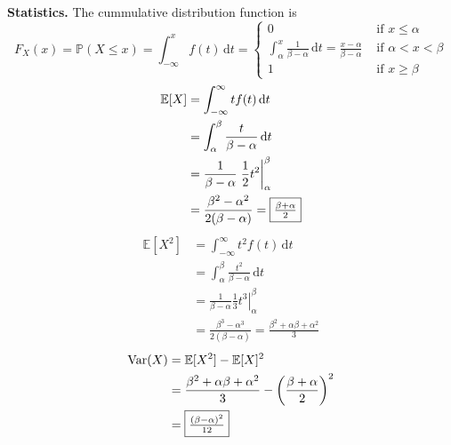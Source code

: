 \documentclass[a4paper,11pt]{amsbook}
\theoremstyle{definition}
\theoremstyle{remark}
\newcommand{\E}{\mathbb{E}}
\renewcommand{\P}{\mathbb{P}}
\DeclareMathOperator\Var{Var}
\newcommand\0{\varnothing}
\newcommand\dt[1][t]{\,\mathrm{d}#1}
\begin{document}
    \textbf{Statistics.} The cummulative distribution function is $$F_X(x)=\P(X\leq x)=\int_{-\infty}^xf(t)\dt=\begin{cases}
        0 & \text{ if }x\leq\alpha \\[5pt]
        \int_\alpha^x\frac1{\beta-\alpha}\dt=\frac{x-\alpha}{\beta-\alpha} & \text{ if }\alpha<x<\beta\\[5pt]
        1 & \text{ if }x\geq\beta
    \end{cases}$$
    \begin{align*}
        \E[X]&=\int_{-\infty}^\infty tf(t)\dt \\
        &=\int_\alpha^\beta\frac{t}{\beta-\alpha}\dt \\
        &=\frac{1}{\beta-\alpha}\left.\frac12t^2\right|_\alpha^\beta \\
        &=\frac{\beta^2-\alpha^2}{2(\beta-\alpha)}=\fbox{$\frac{\beta+\alpha}{2}$}
    \end{align*}
    \begin{align*}
        \E[X^2]&=\int_{-\infty}^\infty t^2f(t)\dt \\
        &=\int_\alpha^\beta\frac{t^2}{\beta-\alpha}\dt \\
        &=\frac{1}{\beta-\alpha}\left.\frac13t^3\right|_\alpha^\beta \\
        &=\frac{\beta^3-\alpha^3}{2(\beta-\alpha)}=\frac{\beta^2+\alpha\beta+\alpha^2}{3}
    \end{align*}
    \begin{align*}
        \Var(X)&=\E[X^2]-\E[X]^2 \\
        &=\frac{\beta^2+\alpha\beta+\alpha^2}{3}-\left(\frac{\beta+\alpha}{2}\right)^2 \\
        &=\fbox{$\frac{(\beta-\alpha)^2}{12}$}
    \end{align*}
\end{document}
